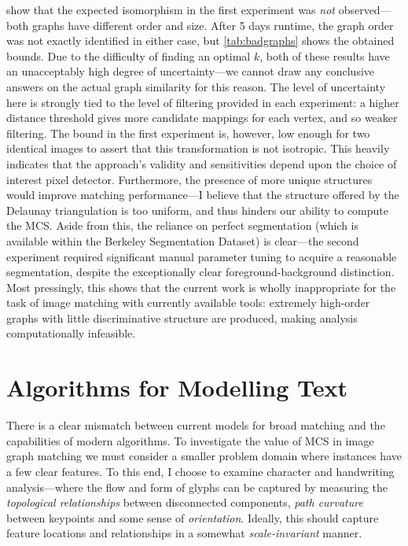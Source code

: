 \documentclass{mpaper}
\begin{document}
 show that the expected isomorphism in the first experiment was \emph{not} observed---both graphs have different order and size.
After 5 days runtime, the graph order was not exactly identified in either case, but \cref{tab:badgraphs} shows the obtained bounds.
Due to the difficulty of finding an optimal $k$, both of these results have an unacceptably high degree of uncertainty---we cannot draw any conclusive answers on the actual graph similarity for this reason.
The level of uncertainty here is strongly tied to the level of filtering provided in each experiment: a higher distance threshold gives more candidate mappings for each vertex, and so weaker filtering.
The bound in the first experiment is, however, low enough for two identical images to assert that this transformation is not isotropic.
This heavily indicates that the approach's validity and sensitivities depend upon the choice of interest pixel detector.
Furthermore, the presence of more unique structures would improve matching performance---I believe that the structure offered by the Delaunay triangulation is too uniform, and thus hinders our ability to compute the MCS.
Aside from this, the reliance on perfect segmentation (which is available within the Berkeley Segmentation Dataset) is clear---the second experiment required significant manual parameter tuning to acquire a reasonable segmentation, despite the exceptionally clear foreground-background distinction.
Most pressingly, this shows that the current work is wholly inappropriate for the task of image matching with currently available tools: extremely high-order graphs with little discriminative structure are produced, making analysis computationally infeasible.

\section{Algorithms for Modelling Text}
\label{sec:algorithm}

There is a clear mismatch between current models for broad matching and the capabilities of modern algorithms.
To investigate the value of MCS in image graph matching we must consider a smaller problem domain where instances have a few clear features.
To this end, I choose to examine character and handwriting analysis---where the flow and form of glyphs can be captured by measuring the \emph{topological relationships} between disconnected components, \emph{path curvature} between keypoints and some sense of \emph{orientation}.
Ideally, this should capture feature locations and relationships in a somewhat \emph{scale-invariant} manner.
\end{document}
